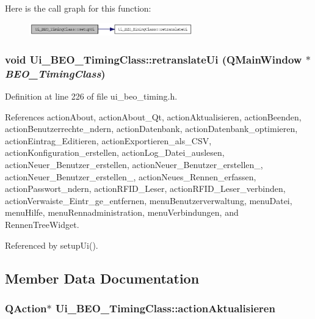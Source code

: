 Here is the call graph for this function:\nopagebreak
\begin{figure}[H]
\begin{center}
\leavevmode
\includegraphics[width=201pt]{class_ui___b_e_o___timing_class_1c3e4c81dd35c43209c07487ed5a841c_cgraph}
\end{center}
\end{figure}
\hypertarget{class_ui___b_e_o___timing_class_e3a56257329a6c1eb15b98af80d6ded1}{
\subsubsection[retranslateUi]{\setlength{\rightskip}{0pt plus 5cm}void Ui\_\-BEO\_\-TimingClass::retranslateUi (QMainWindow $\ast$ {\em BEO\_\-TimingClass})}}
\label{class_ui___b_e_o___timing_class_e3a56257329a6c1eb15b98af80d6ded1}




Definition at line 226 of file ui\_\-beo\_\-timing.h.

References actionAbout, actionAbout\_\-Qt, actionAktualisieren, actionBeenden, actionBenutzerrechte\_\-ndern, actionDatenbank, actionDatenbank\_\-optimieren, actionEintrag\_\-Editieren, actionExportieren\_\-als\_\-CSV, actionKonfiguration\_\-erstellen, actionLog\_\-Datei\_\-auslesen, actionNeuer\_\-Benutzer\_\-erstellen, actionNeuer\_\-Benutzer\_\-erstellen\_, actionNeuer\_\-Benutzer\_\-erstellen\_, actionNeues\_\-Rennen\_\-erfassen, actionPasswort\_\-ndern, actionRFID\_\-Leser, actionRFID\_\-Leser\_\-verbinden, actionVerwaiste\_\-Eintr\_\-ge\_\-entfernen, menuBenutzerverwaltung, menuDatei, menuHilfe, menuRennadministration, menuVerbindungen, and RennenTreeWidget.

Referenced by setupUi().

\subsection{Member Data Documentation}
\hypertarget{class_ui___b_e_o___timing_class_6eea06afd3edb89e9f795eeb0200179a}{
\subsubsection[actionAktualisieren]{\setlength{\rightskip}{0pt plus 5cm}QAction$\ast$ {\bf Ui\_\-BEO\_\-TimingClass::actionAktualisieren}}}
\label{class_ui___b_e_o___timing_class_6eea06afd3edb89e9f795eeb0200179a}




